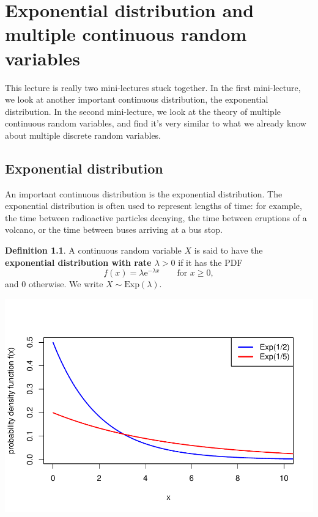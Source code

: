\documentclass[
  a4paper,
]{book}
\theoremstyle{definition}
\newtheorem{definition}{Definition}[chapter]
\theoremstyle{definition}
\theoremstyle{definition}
\theoremstyle{definition}
\theoremstyle{remark}
\begin{document}
\hypertarget{L17-exp-multiple}{%
\chapter{Exponential distribution and multiple continuous random variables}\label{L17-exp-multiple}}

This lecture is really two mini-lectures stuck together. In the first mini-lecture, we look at another important continuous distribution, the exponential distribution. In the second mini-lecture, we look at the theory of multiple continuous random variables, and find it's very similar to what we already know about multiple discrete random variables.

\hypertarget{exponential}{%
\section{Exponential distribution}\label{exponential}}

An important continuous distribution is the exponential distribution. The exponential distribution is often used to represent lengths of time: for example, the time between radioactive particles decaying, the time between eruptions of a volcano, or the time between buses arriving at a bus stop.

\begin{definition}
A continuous random variable \(X\) is said to have the \textbf{exponential distribution with rate \(\lambda > 0\)} if it has the PDF
\[ f(x) = \lambda \mathrm{e}^{-\lambda x} \qquad \text{for $x \geq 0$}, \]
and 0 otherwise. We write \(X \sim \text{Exp}(\lambda)\).
\end{definition}

\includegraphics{math1710_files/figure-latex/exp-pic-1.pdf}
\end{document}
